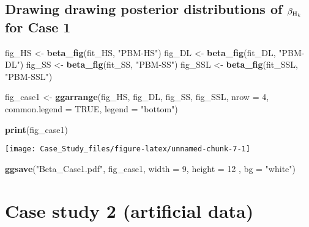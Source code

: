 \documentclass[
]{article}
\newenvironment{Shaded}{\begin{snugshade}}{\end{snugshade}}
\newcommand{\AttributeTok}[1]{\textcolor[rgb]{0.13,0.29,0.53}{#1}}
\newcommand{\ConstantTok}[1]{\textcolor[rgb]{0.56,0.35,0.01}{#1}}
\newcommand{\DecValTok}[1]{\textcolor[rgb]{0.00,0.00,0.81}{#1}}
\newcommand{\FunctionTok}[1]{\textcolor[rgb]{0.13,0.29,0.53}{\textbf{#1}}}
\newcommand{\NormalTok}[1]{#1}
\newcommand{\OtherTok}[1]{\textcolor[rgb]{0.56,0.35,0.01}{#1}}
\newcommand{\StringTok}[1]{\textcolor[rgb]{0.31,0.60,0.02}{#1}}
\begin{document}
\hypertarget{drawing-drawing-posterior-distributions-of-beta_rm-h_k-for-case-1}{%
\subsection{\texorpdfstring{Drawing drawing posterior distributions of
\(\beta_{{\rm H}_k}\) for Case
1}{Drawing drawing posterior distributions of \textbackslash beta\_\{\{\textbackslash rm H\}\_k\} for Case 1}}\label{drawing-drawing-posterior-distributions-of-beta_rm-h_k-for-case-1}}

\begin{Shaded}
\begin{Highlighting}[]
\NormalTok{fig\_HS }\OtherTok{\textless{}{-}} \FunctionTok{beta\_fig}\NormalTok{(fit\_HS, }\StringTok{"PBM{-}HS"}\NormalTok{)}
\NormalTok{fig\_DL }\OtherTok{\textless{}{-}} \FunctionTok{beta\_fig}\NormalTok{(fit\_DL, }\StringTok{"PBM{-}DL"}\NormalTok{)}
\NormalTok{fig\_SS }\OtherTok{\textless{}{-}} \FunctionTok{beta\_fig}\NormalTok{(fit\_SS, }\StringTok{"PBM{-}SS"}\NormalTok{)}
\NormalTok{fig\_SSL }\OtherTok{\textless{}{-}} \FunctionTok{beta\_fig}\NormalTok{(fit\_SSL, }\StringTok{"PBM{-}SSL"}\NormalTok{)}

\NormalTok{fig\_case1 }\OtherTok{\textless{}{-}} \FunctionTok{ggarrange}\NormalTok{(fig\_HS, fig\_DL, fig\_SS, fig\_SSL, }
                       \AttributeTok{nrow =} \DecValTok{4}\NormalTok{, }\AttributeTok{common.legend =} \ConstantTok{TRUE}\NormalTok{, }\AttributeTok{legend =} \StringTok{"bottom"}\NormalTok{)}

\FunctionTok{print}\NormalTok{(fig\_case1)}
\end{Highlighting}
\end{Shaded}

\begin{center}\texttt{[image: Case\_Study\_files/figure-latex/unnamed-chunk-7-1]} \end{center}

\begin{Shaded}
\begin{Highlighting}[]
\FunctionTok{ggsave}\NormalTok{(}\StringTok{"Beta\_Case1.pdf"}\NormalTok{, fig\_case1, }\AttributeTok{width =} \DecValTok{9}\NormalTok{, }\AttributeTok{height =} \DecValTok{12}\NormalTok{ , }\AttributeTok{bg =} \StringTok{"white"}\NormalTok{)}
\end{Highlighting}
\end{Shaded}

\hypertarget{case-study-2-artificial-data}{%
\section{Case study 2 (artificial
data)}\label{case-study-2-artificial-data}}
\end{document}
